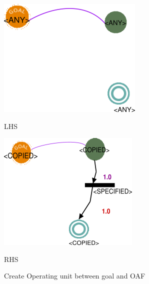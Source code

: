 \vspace{1cm}
\begin{figure}[th]
\centering
\begin{minipage}{.6\textwidth}
 
  \includegraphics[width=.7\linewidth]{Chapiter3/img/L7}
\linebreak  

\hspace{2.5cm}  LHS 
 
  
\end{minipage}%
\begin{minipage}{.6\textwidth}
 
  \includegraphics[width=.7\linewidth]{Chapiter3/img/R7}
\linebreak  

\hspace{2.5cm}  RHS 
\end{minipage}
\caption{\label{fig:Create Operating unit between  goal and OAF}Create Operating unit between  goal and OAF}
 
\end{figure}
\vspace{1cm}




